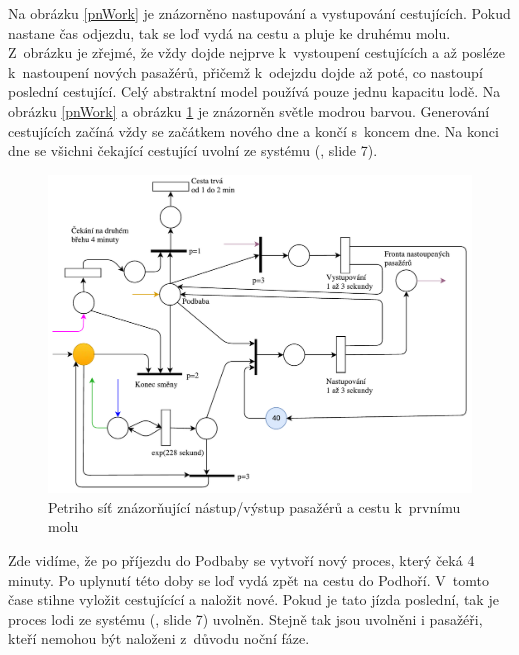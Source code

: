 \documentclass[11pt,a4paper]{article}
\begin{document}
	\newpage
	Na obrázku \ref{pnWork} je znázorněno nastupování a vystupování cestujících. Pokud nastane čas
	odjezdu, tak se loď vydá na cestu a pluje ke druhému molu. Z~obrázku je zřejmé, že vždy dojde
	nejprve k~vystoupení cestujících a až posléze k~nastoupení nových pasažérů, přičemž k~odejzdu
	dojde až poté, co nastoupí poslední cestující. Celý abstraktní model používá pouze jednu kapacitu lodě.
	Na obrázku \ref{pnWork} a obrázku \ref{pnWork2} je znázorněn světle modrou barvou.
	Generování cestujících začíná vždy se začátkem nového dne a končí s~koncem dne.
	Na konci dne se všichni čekající cestující uvolní ze systému (\cite{SLAJD}, slide 7).

	\begin{figure}[ht]
		\centering
		\includegraphics[scale=0.7, width=\textwidth]{pn-work2.pdf}
		\caption{Petriho síť znázorňující nástup/výstup pasažérů a cestu k~prvnímu molu}
		\label{pnWork2}
	\end{figure}
	Zde vidíme, že po příjezdu do Podbaby se vytvoří nový proces, který čeká 4 minuty.
	Po uplynutí této doby se loď vydá zpět na cestu do Podhoří. V~tomto čase stihne vyložit
	cestujícící a naložit nové. Pokud je tato jízda poslední, tak je proces lodi ze systému (\cite{SLAJD}, slide 7) uvolněn.
	Stejně tak jsou uvolněni i pasažéři, kteří nemohou být naloženi z~důvodu noční fáze.

 \newpage
\end{document}
